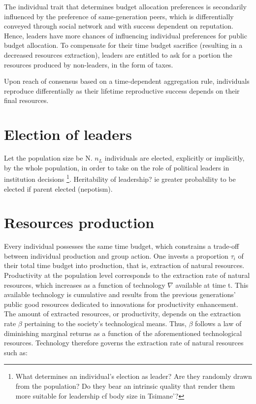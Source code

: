 \documentclass[a4paper]{article}
\begin{document}
The individual trait that determines budget allocation preferences is secondarily influenced by the preference of same-generation peers, which is differentially conveyed through social network and with success dependent on reputation. Hence, leaders have more chances of influencing individual preferences for public budget allocation. To compensate for their time budget sacrifice (resulting in a decreased resources extraction), leaders are entitled to ask for a portion the resources produced by non-leaders, in the form of taxes.

Upon reach of consensus based on a time-dependent aggregation rule, individuals reproduce differentially as their lifetime reproductive success depends on their final resources.     

\section{Election of leaders}
\label{sec:elec}

Let the population size be N. $n_L$ individuals are elected, explicitly or implicitly, by the whole population, in order to take on the role of political leaders in institution decisions \footnote{What determines an individual's election as leader? Are they randomly drawn from the population? Do they bear an intrinsic quality that render them more suitable for leadership cf body size in Tsimane'?}.
Heritability of leadership? ie greater probability to be elected if parent elected (nepotism).

\section{Resources production}
\label{sec:prod}

Every individual possesses the same time budget, which constrains a trade-off between individual production and group action. One invests a proportion $\tau_i$ of their total time budget into production, that is, extraction of natural resources. Productivity at the population level corresponds to the extraction rate of natural resources, which increases as a function of technology $\nabla$ available at time t. This available technology is cumulative and results from the previous generations' public good resources dedicated to innovations for productivity enhancement. The amount of extracted resources, or productivity, depends on the extraction rate $\beta$ pertaining to the society's technological means. Thus, $\beta$ follows a law of diminishing marginal returns as a function of the aforementioned technological resources. Technology therefore governs the extraction rate of natural resources such as:
\end{document}
